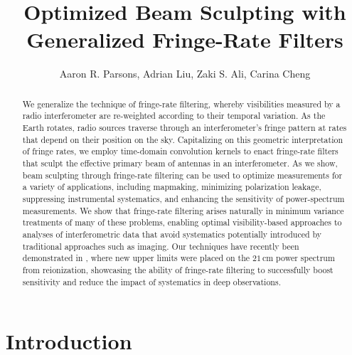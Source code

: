 \documentclass[twocolumn,apj,numberedappendix]{emulateapj}
\begin{document}
\title{Optimized Beam Sculpting with Generalized Fringe-Rate Filters}

\author{
Aaron R. Parsons,
Adrian Liu,
Zaki S. Ali,
Carina Cheng
}


\begin{abstract}
We generalize the technique of fringe-rate filtering, whereby visibilities 
measured by a radio interferometer are re-weighted according to their temporal variation.
As the Earth rotates, radio sources traverse through an interferometer's fringe pattern
at rates that depend on their position on the sky.  Capitalizing on this geometric interpretation
of fringe rates, we employ time-domain convolution kernels to
enact fringe-rate filters that sculpt the effective primary beam of antennas in an interferometer.   As we show,
beam sculpting through fringe-rate filtering 
can be used to optimize measurements for a variety of applications,
including mapmaking, minimizing polarization leakage, suppressing instrumental systematics,
and enhancing the sensitivity of power-spectrum measurements. We show that fringe-rate filtering arises naturally in minimum variance
treatments of many of these problems, enabling optimal visibility-based approaches to analyses of
interferometric data that avoid systematics potentially introduced by traditional approaches such as imaging. Our techniques have
recently been demonstrated in \citet{ali_et_al2015}, where new upper limits
were placed on the $21\,\textrm{cm}$ power spectrum from reionization, showcasing the ability
of fringe-rate filtering to successfully boost sensitivity and reduce the impact of systematics in
deep observations.
\end{abstract}



\section{Introduction}
\end{document}
